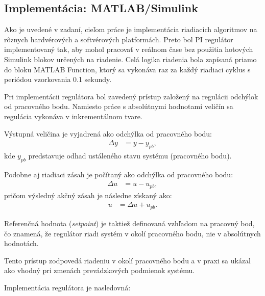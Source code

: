 \subsection{Implementácia: MATLAB/Simulink}

Ako je uvedené v zadaní, cieľom práce je implementácia riadiacich algoritmov na rôznych hardvérových a softvérových platformách.  
Preto bol PI regulátor implementovaný tak, aby mohol pracovať v reálnom čase bez použitia hotových Simulink blokov určených na riadenie.  
Celá logika riadenia bola zapísaná priamo do bloku MATLAB Function, ktorý sa vykonáva raz za každý riadiaci cyklus s periódou vzorkovania 0.1 sekundy.

Pri implementácii regulátora bol zavedený prístup založený na regulácii odchýlok od pracovného bodu.  
Namiesto práce s absolútnymi hodnotami veličín sa regulácia vykonáva v inkrementálnom tvare.

Výstupná veličina je vyjadrená ako odchýlka od pracovného bodu:
\begin{align}
    \Delta y &= y - y_{pb},
    \label{eq:pi_delta_y} 
\end{align}
kde $y_{pb}$ predstavuje odhad ustáleného stavu systému (pracovného bodu).

Podobne aj riadiaci zásah je počítaný ako odchýlka od pracovného bodu:
\begin{align}
    \Delta u &= u - u_{pb},
    \label{eq:pi_delta_u} 
\end{align}
pričom výsledný akčný zásah je následne získaný ako:
\begin{align}
    u &= \Delta u + u_{pb}.
    \label{eq:pi_u_from_du}
\end{align}

Referenčná hodnota (\textit{setpoint}) je taktiež definovaná vzhľadom na pracovný bod, čo znamená, že regulátor riadi systém v okolí pracovného bodu, nie v absolútnych hodnotách.

Tento prístup zodpovedá riadeniu v okolí pracovného bodu a v praxi sa ukázal ako
vhodný pri zmenách prevádzkových podmienok systému.

Implementácia regulátora je nasledovná:

